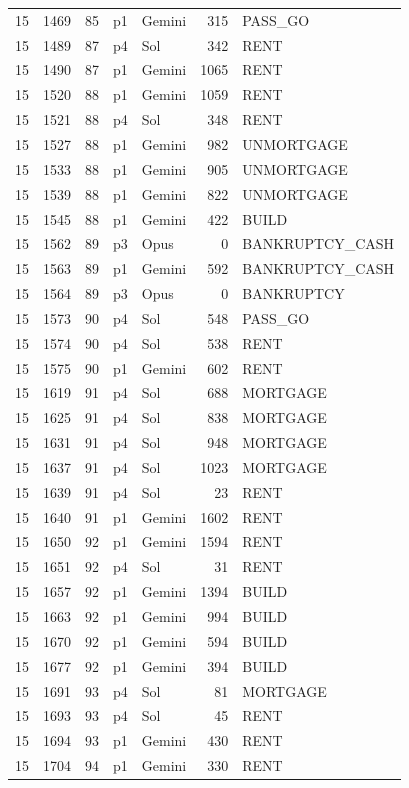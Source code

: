 \begin{longtable}{r r r l l r >{\ttfamily}l}
15 & 1469 & 85 & p1 & Gemini & 315 & PASS\_GO \\
15 & 1489 & 87 & p4 & Sol & 342 & RENT \\
15 & 1490 & 87 & p1 & Gemini & 1065 & RENT \\
15 & 1520 & 88 & p1 & Gemini & 1059 & RENT \\
15 & 1521 & 88 & p4 & Sol & 348 & RENT \\
15 & 1527 & 88 & p1 & Gemini & 982 & UNMORTGAGE \\
15 & 1533 & 88 & p1 & Gemini & 905 & UNMORTGAGE \\
15 & 1539 & 88 & p1 & Gemini & 822 & UNMORTGAGE \\
15 & 1545 & 88 & p1 & Gemini & 422 & BUILD \\
15 & 1562 & 89 & p3 & Opus & 0 & BANKRUPTCY\_CASH \\
15 & 1563 & 89 & p1 & Gemini & 592 & BANKRUPTCY\_CASH \\
15 & 1564 & 89 & p3 & Opus & 0 & BANKRUPTCY \\
15 & 1573 & 90 & p4 & Sol & 548 & PASS\_GO \\
15 & 1574 & 90 & p4 & Sol & 538 & RENT \\
15 & 1575 & 90 & p1 & Gemini & 602 & RENT \\
15 & 1619 & 91 & p4 & Sol & 688 & MORTGAGE \\
15 & 1625 & 91 & p4 & Sol & 838 & MORTGAGE \\
15 & 1631 & 91 & p4 & Sol & 948 & MORTGAGE \\
15 & 1637 & 91 & p4 & Sol & 1023 & MORTGAGE \\
15 & 1639 & 91 & p4 & Sol & 23 & RENT \\
15 & 1640 & 91 & p1 & Gemini & 1602 & RENT \\
15 & 1650 & 92 & p1 & Gemini & 1594 & RENT \\
15 & 1651 & 92 & p4 & Sol & 31 & RENT \\
15 & 1657 & 92 & p1 & Gemini & 1394 & BUILD \\
15 & 1663 & 92 & p1 & Gemini & 994 & BUILD \\
15 & 1670 & 92 & p1 & Gemini & 594 & BUILD \\
15 & 1677 & 92 & p1 & Gemini & 394 & BUILD \\
15 & 1691 & 93 & p4 & Sol & 81 & MORTGAGE \\
15 & 1693 & 93 & p4 & Sol & 45 & RENT \\
15 & 1694 & 93 & p1 & Gemini & 430 & RENT \\
15 & 1704 & 94 & p1 & Gemini & 330 & RENT \\

\end{longtable}
